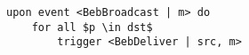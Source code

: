 \begin{lstlisting}[caption={Best-effort broadcast}, mathescape]
upon event <BebBroadcast | m> do
    for all $p \in dst$
        trigger <BebDeliver | src, m>
\end{lstlisting}
